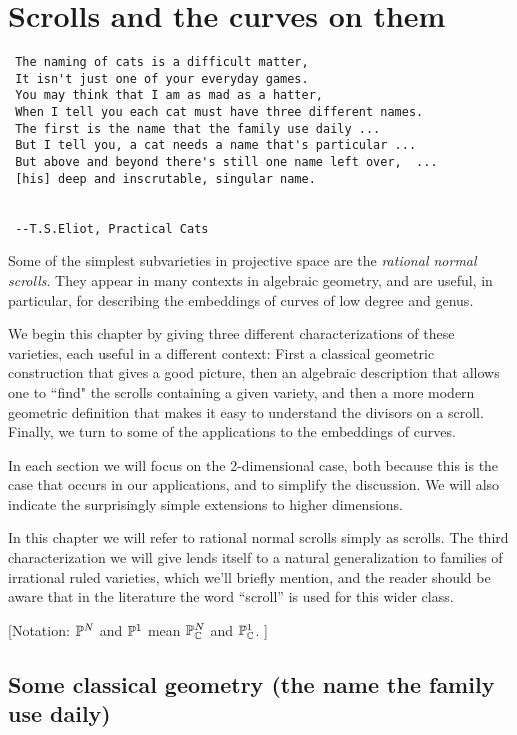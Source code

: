 

\chapter{Scrolls and the curves on them}
\label{ScrollsChapter}

\begin{verbatim}
 The naming of cats is a difficult matter,
 It isn't just one of your everyday games.
 You may think that I am as mad as a hatter,
 When I tell you each cat must have three different names.
 The first is the name that the family use daily ...
 But I tell you, a cat needs a name that's particular ...
 But above and beyond there's still one name left over,  ...
 [his] deep and inscrutable, singular name.

 
 --T.S.Eliot, Practical Cats
\end{verbatim}

Some of the simplest subvarieties in projective space are the \emph{rational normal scrolls}. They appear in many contexts in algebraic geometry, and are useful, in particular, for describing the embeddings of curves of low degree and genus. 

We begin this chapter by giving three different characterizations of these varieties, each useful in a different context: First a classical geometric construction that gives a good picture, then an algebraic description that allows one to ``find" the scrolls containing a given variety, and then a more modern geometric definition that makes it easy to understand the divisors on a scroll. Finally, we turn to some of the applications to the embeddings of curves.

In each section we will focus on the 2-dimensional case, both because this is the case that occurs in our applications, and to simplify the discussion. We will also indicate the surprisingly simple extensions to higher dimensions.

In this chapter we will refer to rational normal scrolls simply as scrolls. The third characterization we will give lends itself to a natural generalization to families of irrational ruled varieties, which we'll briefly mention, and the reader should be aware that in the literature the word ``scroll'' is used for this wider class.

[Notation:  $\PP^{N}$ and $\PP^{1}$ mean $\PP_{\CC}^{N}$ and $\PP_{\CC}^{1}$. ]

\section{Some classical geometry (the name the family use daily)}\label{daily name}

